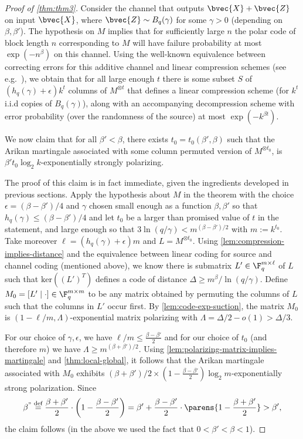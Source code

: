 \documentclass[11pt]{article}
\begin{document}
\begin{proof}[Proof of \cref{thm:thm3}]
	Consider the channel that outputs $\bvec{X} + \bvec{Z}$ on input $\bvec{X}$, where $\bvec{Z} \sim B_q(\gamma)$ for some $\gamma > 0$ (depending on $\beta, \beta'$). 
	The hypothesis on $M$ implies that for sufficiently large $n$ the polar code of block length $n$ corresponding to $M$ will have failure probability at most $\exp(-n^{\beta})$ on this channel.  Using the well-known equivalence between correcting errors for this additive channel and linear compression schemes (see e.g.~\cite[Prop. 11.2.1]{essential-coding}), we obtain that for all large enough $t$ there is some subset $S$ of $(h_q(\gamma)+\epsilon) k^t$ columns of $M^{\otimes t}$ that defines a linear compression scheme (for $k^t$ i.i.d copies of $B_q(\gamma)$), along with an accompanying decompression scheme with error probability (over the randomness of the source) at most $\exp(-k^{\beta t})$. 
	
	We now claim that  for all $\beta' < \beta$, there exists $t_0 = t_0(\beta',\beta)$ such that the Arikan martingale associated with some column permuted version of $M^{\otimes t_0}$, is $\beta' t_0 \log_2 k$-exponentially strongly polarizing.
	
	The proof of this claim  is in fact immediate, given the ingredients developed in previous sections. Apply the hypothesis about $M$ in the theorem with the choice $\epsilon  = (\beta-\beta')/4$ and $\gamma$ chosen small enough as a function $\beta,\beta'$ so that $h_q(\gamma)  \le (\beta-\beta')/4$ and let $t_0$ be a larger than promised value of $t$ in the statement, and large enough so that $3 \ln(q/\gamma) < m^{(\beta - \beta')/2}$ with $m := k^{t_0}$. Take moreover $\ell =  (h_q(\gamma)+\epsilon) m$ and $L = M^{\otimes t_0}$. 
	Using \cref{lem:compression-implies-distance} and the equivalence between linear coding for source and channel coding (mentioned above), we know there is submatrix $L' \in \F_q^{m \times \ell}$ of $L$ such that $\mathrm{ker}((L')^T)$ defines a code of distance $\Delta \ge m^{\beta}/\ln(q/\gamma)$. Define $M_0 = [ L' \mid \cdot] \in \F_q^{m \times m}$ to be any matrix obtained by permuting the columns of $L$ such that the columns in $L'$ occur first. By \cref{lem:code-exp-suction},  the matrix $M_0$ is $(1 -\ell/m,\Lambda)$-exponential matrix polarizing with $\Lambda = \Delta/2 - o(1) > \Delta/3$.

	For our choice of $\gamma,\epsilon$, we have $\ell/m \le \frac{\beta -\beta'}{2}$ and for our choice of $t_0$ (and therefore $m$) we have  $\Lambda \ge m^{(\beta+\beta')/2}$. Using \cref{lem:polarizing-matrix-implies-martingale} and \cref{thm:local-global}, it follows that the Arikan martingale associated with $M_0$ exhibits 
	$(\beta+\beta')/2 \times \left(1 - \frac{\beta-\beta'}{2} \right) \log_2 m$-exponentially strong polarization. 
	Since 
	\[\beta^"\stackrel{\text{def}}{=} \frac{\beta+\beta'}2 \cdot \left(1 - \frac{\beta-\beta'}{2} \right)= \beta'+ \frac{\beta-\beta'}2\cdot \parens{1- \frac{\beta+\beta'}2}> \beta',\] 
	the claim follows (in the above we used the fact that $0<\beta'<\beta<1$).
	

\end{proof}
\end{document}
